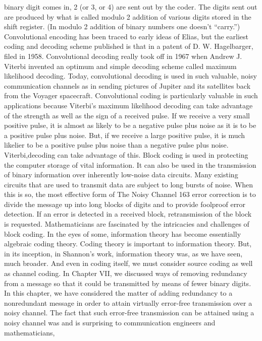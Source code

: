 {{{{{{{{{{binary digit comes in, 2 (or 3, or 4) are sent out by the coder. The
digits sent out are produced by what is called modulo 2 addition of
various digits stored in the shift register. (In modulo 2 addition
of binary numbers one doesn’t “carry.”)
Convolutional encoding has been traced to early ideas of Elias,
but the earliest coding and decoding scheme published is that in a
patent of D. W. Hagelbarger, filed in 1958. Convolutional decoding
really took off in 1967 when Andrew J. Viterbi invented an
optimum and simple decoding scheme called maximum likelihood
decoding.
Today, convolutional decoding is used in such valuable, noisy
communication channels as in sending pictures of Jupiter and its
satellites back from the Voyager spacecraft. Convolutional coding
is particularly valuable in such applications because Viterbi’s
maximum likelihood decoding can take advantage of the strength
as well as the sign of a received pulse.
If we receive a very small positive pulse, it is almost as likely
to be a negative pulse plus noise as it is to be a positive pulse plus
noise. But, if we receive a large positive pulse, it is much likelier
to be a positive pulse plus noise than a negative pulse plus noise.
Viterbi,decoding can take advantage of this.
Block coding is used in protecting the computer storage of vital
information. It can also be used in the transmission of binary information
over inherently low-noise data circuits.
Many existing circuits that are used to transmit data are subject
to long bursts of noise. When this is so, the most effective form of
The Noisy Channel
163
error correction is to divide the message up into long blocks of
digits and to provide foolproof error detection. If an error is detected
in a received block, retransmission of the block is requested.
Mathematicians are fascinated by the intricacies and challenges
of block coding. In the eyes of some, information theory has become
essentially algebraic coding theory. Coding theory is important
to information theory. But, in its inception, in Shannon’s
work, information theory was, as we have seen, much broader. And
even in coding itself, we must consider source coding as well as
channel coding.
In Chapter VII, we discussed ways of removing redundancy
from a message so that it could be transmitted by means of fewer
binary digits. In this chapter, we have considered the matter of
adding redundancy to a nonredundant message in order to attain
virtually error-free transmission over a noisy channel. The fact that
such error-free transmission can be attained using a noisy channel
was and is surprising to communication engineers and mathematicians,
}}}}}}}}}}
